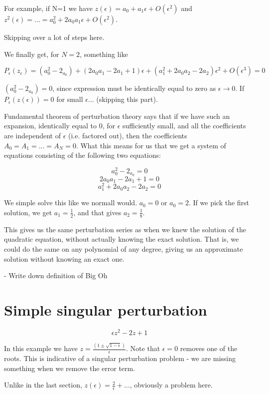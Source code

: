 \documentclass[12pt]{report}
\begin{document}
For example, if N=1 we have $z(\epsilon) = a_0 + a_1\epsilon + O(\epsilon^2)$
and $z^2(\epsilon) = ... = a_0^2 + 2 a_0 a_1 \epsilon + O(\epsilon^2)$.

Skipping over a lot of steps here.

We finally get, for $N=2$, something like

$$P_\epsilon(z_\epsilon) = (a_0^2 - 2_{a_0}) + (2 a_0 a_1 - 2 a_1 +1)\epsilon + (a_1^2 + 2 a_0 a_2 -
2 a_2)\epsilon^2 + O(\epsilon^3) = 0$$

$(a_0^2 - 2_{a_0}) = 0$, since expression must be identically equal to zero as
$\epsilon \to 0$. If $P_\epsilon(z(\epsilon)) = 0$ for small $\epsilon$... (skipping this part).

Fundamental theorem of perturbation theory says that if we have such an
expansion, identically equal to 0, for $\epsilon$ sufficiently small, and all
the coefficients are independent of $\epsilon$ (i.e. factored out), then the
coefficients $A_0 = A_1 = ... = A_N = 0$. What this means for us that we get a
system of equations consisting of the following two equations:

$$ a_0^2 - 2_{a_0} = 0$$
$$ 2 a_0 a_1 - 2 a_1 +1 = 0 $$
$$ a_1^2 + 2 a_0 a_2 -2 a_2 = 0$$

We simple solve this like we normall would. $a_0 = 0$ or $a_0 = 2$. If we pick
the first solution, we get $a_1=\frac 1 2$, and that gives $a_2 = \frac 1 8$.

This gives us the same perturbation series as when we knew the solution of the
quadratic equation, without actually knowing the exact solution. That is, we
could do the same on any polynomial of any degree, giving us an approximate
solution without knowing an exact one.


- Write down definition of Big Oh

\section{Simple singular perturbation}

\begin{equation}
  \epsilon z^2 - 2z + 1
\end{equation}

In this example we have $z = \frac{(1 \pm \sqrt{1-\epsilon})}{\epsilon}$. Note
that $\epsilon=0$ removes one of the roots. This is indicative of a singular
perturbation problem - we are missing something when we remove the error term.

Unlike in the last section, $z(\epsilon) = \frac 2 \epsilon + ...$, obviously a
problem here.
\end{document}
